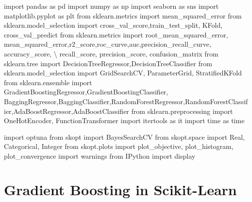 \documentclass[
  letterpaper,
  DIV=11,
  numbers=noendperiod]{scrreprt}
\newenvironment{Shaded}{\begin{snugshade}}{\end{snugshade}}
\newcommand{\ImportTok}[1]{\textcolor[rgb]{0.00,0.46,0.62}{#1}}
\newcommand{\NormalTok}[1]{\textcolor[rgb]{0.00,0.23,0.31}{#1}}
\newcommand{\OperatorTok}[1]{\textcolor[rgb]{0.37,0.37,0.37}{#1}}
\begin{document}
\begin{Shaded}
\begin{Highlighting}[]
\ImportTok{import}\NormalTok{ pandas }\ImportTok{as}\NormalTok{ pd}
\ImportTok{import}\NormalTok{ numpy }\ImportTok{as}\NormalTok{ np}
\ImportTok{import}\NormalTok{ seaborn }\ImportTok{as}\NormalTok{ sns}
\ImportTok{import}\NormalTok{ matplotlib.pyplot }\ImportTok{as}\NormalTok{ plt}
\ImportTok{from}\NormalTok{ sklearn.metrics }\ImportTok{import}\NormalTok{ mean\_squared\_error}
\ImportTok{from}\NormalTok{ sklearn.model\_selection }\ImportTok{import}\NormalTok{ cross\_val\_score,train\_test\_split, KFold, cross\_val\_predict}
\ImportTok{from}\NormalTok{ sklearn.metrics }\ImportTok{import}\NormalTok{ root\_mean\_squared\_error, mean\_squared\_error,r2\_score,roc\_curve,auc,precision\_recall\_curve, accuracy\_score, }\OperatorTok{\textbackslash{}}
\NormalTok{recall\_score, precision\_score, confusion\_matrix}
\ImportTok{from}\NormalTok{ sklearn.tree }\ImportTok{import}\NormalTok{ DecisionTreeRegressor,DecisionTreeClassifier}
\ImportTok{from}\NormalTok{ sklearn.model\_selection }\ImportTok{import}\NormalTok{ GridSearchCV, ParameterGrid, StratifiedKFold}
\ImportTok{from}\NormalTok{ sklearn.ensemble }\ImportTok{import}\NormalTok{ GradientBoostingRegressor,GradientBoostingClassifier, BaggingRegressor,BaggingClassifier,RandomForestRegressor,RandomForestClassifier,AdaBoostRegressor,AdaBoostClassifier}
\ImportTok{from}\NormalTok{ sklearn.preprocessing }\ImportTok{import}\NormalTok{ OneHotEncoder, FunctionTransformer}
\ImportTok{import}\NormalTok{ itertools }\ImportTok{as}\NormalTok{ it}
\ImportTok{import}\NormalTok{ time }\ImportTok{as}\NormalTok{ time}

\ImportTok{import}\NormalTok{ optuna}
\ImportTok{from}\NormalTok{ skopt }\ImportTok{import}\NormalTok{ BayesSearchCV}
\ImportTok{from}\NormalTok{ skopt.space }\ImportTok{import}\NormalTok{ Real, Categorical, Integer}
\ImportTok{from}\NormalTok{ skopt.plots }\ImportTok{import}\NormalTok{ plot\_objective, plot\_histogram, plot\_convergence}
\ImportTok{import}\NormalTok{ warnings}
\ImportTok{from}\NormalTok{ IPython }\ImportTok{import}\NormalTok{ display}
\end{Highlighting}
\end{Shaded}

\section{Gradient Boosting in
Scikit-Learn}\label{gradient-boosting-in-scikit-learn}
\end{document}
